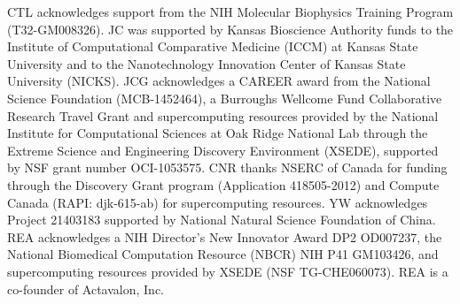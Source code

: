 \par CTL acknowledges support from the NIH Molecular Biophysics Training Program\\ (T32-GM008326).  JC was supported by Kansas Bioscience Authority funds to the Institute of Computational Comparative Medicine (ICCM) at Kansas State University and to the Nanotechnology Innovation Center of Kansas State University (NICKS).  JCG acknowledges a CAREER award from the National Science Foundation (MCB-1452464), a Burroughs Wellcome Fund Collaborative Research Travel Grant and supercomputing resources provided by the National Institute for Computational Sciences at Oak Ridge National Lab through the Extreme Science and Engineering Discovery Environment (XSEDE), supported by NSF grant number OCI-1053575.  CNR thanks NSERC of Canada for funding through the Discovery Grant program (Application 418505-2012) and Compute Canada (RAPI: djk-615-ab) for supercomputing resources.  YW acknowledges Project 21403183 supported by National Natural Science Foundation of China.  REA acknowledges a NIH Director's New Innovator Award DP2 OD007237, the National Biomedical Computation Resource (NBCR) NIH P41 GM103426, and supercomputing resources provided by XSEDE (NSF TG-CHE060073).  REA is a co-founder of Actavalon, Inc.
